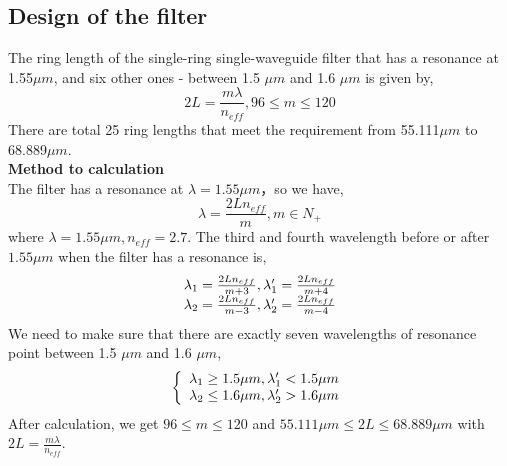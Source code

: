 \documentclass[fontsize=11pt]{scrartcl}
\begin{document}
\subsection{Design of the filter}
The ring length of the single-ring single-waveguide filter that has a resonance at
1.55$\mu m$, and six other ones - between 1.5 $\mu m$ and 1.6 $\mu m$ is given by,\\
\begin{equation}
    2L=\frac{m\lambda}{n_{eff}}, 96\leq m\leq 120
    \label{2L_1}
\end{equation}
There are total 25 ring lengths that meet the requirement from 55.111$\mu m$ to 68.889$\mu m$. \\
\textbf{Method to calculation}\\
The filter has a resonance at $\lambda=1.55\mu m $，so we have,\\
\begin{equation}
    \lambda=\frac{2Ln_{eff}} m , m\in N_+  
\end{equation}
where $\lambda=1.55\mu m,n_{eff}=2.7$.
The third and fourth wavelength before or after $1.55\mu m$ when the filter has a resonance is,
\begin{equation}
    \begin{array}[]{lr}
    \lambda_1=\frac{2Ln_{eff}}{m+3},\lambda_1'=\frac{2Ln_{eff}}{m+4} \\
    \lambda_2=\frac{2Ln_{eff}}{m-3},\lambda_2'=\frac{2Ln_{eff}}{m-4}
    \end{array}
\end{equation}
We need to make sure that there are exactly seven wavelengths of resonance point between 1.5 $\mu m$ and 1.6 $\mu m$,
\begin{equation}
    \left\{ 
        \begin{array}[]{lr}
             \lambda_1 \geq 1.5 \mu m, \lambda_1'<1.5\mu m\\
             \lambda_2 \leq 1.6 \mu m, \lambda_2'>1.6\mu m 
        \end{array}
   \right.
\end{equation}
After calculation, we get $96\leq m\leq 120$ and $55.111\mu m\leq 2L\leq 68.889\mu m$ with $2L=\frac{m\lambda}{n_{eff}}$.
\end{document}
